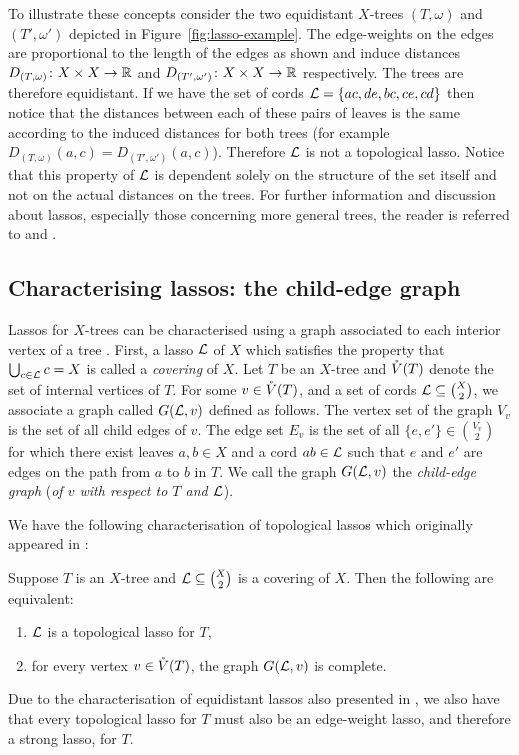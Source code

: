 To illustrate these concepts consider the two equidistant $X$-trees
$(T,\omega)$ and $(T',\omega')$ depicted in Figure~\ref{fig:lasso-example}.
The edge-weights on the edges are proportional to the length of the edges as
shown and induce distances $D_{(T,\omega)} \colon X \times X \to {\mathbb R}$ and
$D_{(T',\omega')} \colon X \times X \to {\mathbb R}$ respectively.  The trees are
therefore equidistant.  If we have the set of cords ${\mathcal L}=\{ac,de,bc,ce,cd\}$
then notice that the distances between each of these pairs of leaves is the
same according to the induced distances for both trees (for example
$D_{(T,\omega)}(a,c) = D_{(T',\omega')}(a,c)$).  Therefore ${\mathcal L}$ is not a
topological lasso.  Notice that this property of ${\mathcal L}$ is dependent solely on
the structure of the set itself and not on the actual distances on the trees.
For further information and discussion about lassos, especially those
concerning more general trees, the reader is referred to
\cite{dress11lassoing} and \cite{huber2014tree}.

\subsection{Characterising lassos: the child-edge graph}
\label{sec:lassoing-rooted-x}

Lassos for $X$-trees can be characterised using a graph associated to each
interior vertex of a tree \cite{huber13lassoing}.  First, a lasso ${\mathcal L}$ of $X$
which satisfies the property that $\bigcup_{c \in {\mathcal L}} c = X$ is called a
\textit{covering} of $X$.  Let $T$ be an $X$-tree and $\mathring{V}(T)$ denote the set
of internal vertices of $T$.  For some $v \in \mathring{V}(T)$, and a set of cords ${\mathcal L}
\subseteq {X \choose 2}$, we associate a graph called $G({\mathcal L},v)$ defined as
follows.  The vertex set of the graph $V_v$ is the set of all child edges of
$v$.  The edge set $E_v$ is the set of all $\{e,e'\} \in {V_v \choose 2}$ for
which there exist leaves $a,b \in X$ and a cord $ab \in {\mathcal L}$ such that $e$ and
$e'$ are edges on the path from $a$ to $b$ in $T$.  We call the graph
$G({\mathcal L},v)$ the \textit{child-edge graph} (\textit{of $v$ with respect to $T$
  and ${\mathcal L}$}).

We have the following characterisation of topological lassos which originally
appeared in \cite{huber13lassoing}:
\begin{thm}
  \label{thm:child-edge-graph-complete}
  Suppose $T$ is an $X$-tree and ${\mathcal L} \subseteq {X \choose 2}$ is a covering
  of $X$.  Then the following are equivalent:
  \begin{enumerate}
  \item ${\mathcal L}$ is a topological lasso for $T$,
  \item for every vertex $v \in \mathring{V}(T)$, the graph $G({\mathcal L},v)$ is complete.
  \end{enumerate}
\end{thm}

Due to the characterisation of equidistant lassos also presented in
\cite{huber13lassoing}, we also have that every topological lasso for $T$ must also be an
edge-weight lasso, and therefore a strong lasso, for $T$.

